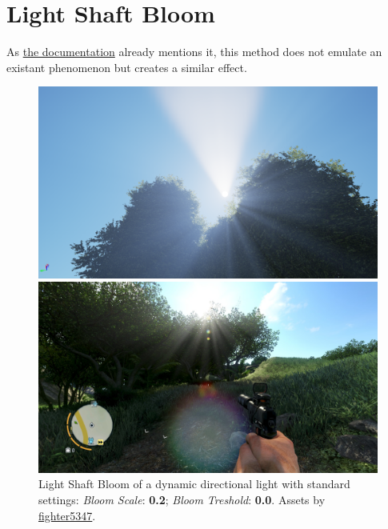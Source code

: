 \documentclass[A4]{article}
\begin{document}
	\section*{Light Shaft Bloom}
	As \href{https://docs.unrealengine.com/latest/INT/Engine/Rendering/LightingAndShadows/LightShafts/index.html#bloommethod}{the documentation} already mentions it, this method does not emulate an existant phenomenon but creates a similar effect.
	\begin{figure}
		\vspace{-20px}
		\begin{center}
			\includegraphics[scale=0.13]{Bloom.png}
		\end{center}
		\vspace{-20px}
		\caption{Light Shaft Bloom of a dynamic directional light with standard settings: \textit{Bloom Scale}: \textbf{0.2}; \textit{Bloom Treshold}: \textbf{0.0}. Assets by \href{https://forums.unrealengine.com/showthread.php?59812-FREE-Foliage-Starter-Kit}{fighter5347}.}
		\begin{center}
			\includegraphics[scale=0.07]{FarCry.jpg}
		\end{center}

\end{figure}
\end{document}
